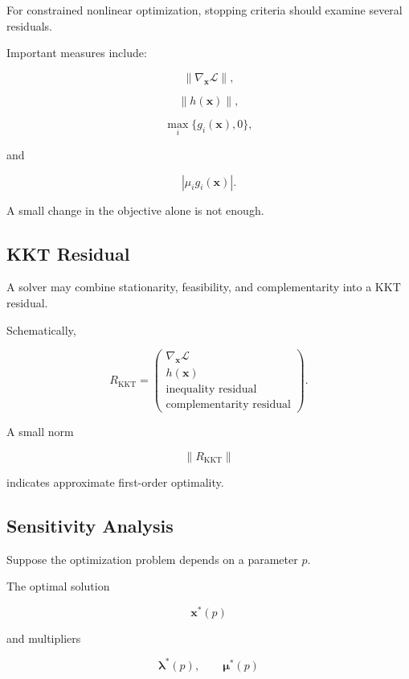 For constrained nonlinear optimization, stopping criteria should examine
several residuals.

Important measures include:

\[
\boxed{
\|\nabla_{\mathbf{x}}\mathcal{L}\|,
}
\]

\[
\boxed{
\|h(\mathbf{x})\|,
}
\]

\[
\boxed{
\max_i
\{
g_i(\mathbf{x}),0
\},
}
\]

and

\[
\boxed{
|\mu_i g_i(\mathbf{x})|.
}
\]

A small change in the objective alone is not enough.

\subsection{KKT Residual}
\label{subsec:nlp-kkt-residual}

A solver may combine stationarity, feasibility, and complementarity into a
KKT residual.

Schematically,

\[
\boxed{
R_{\mathrm{KKT}}
=
\begin{pmatrix}
\nabla_{\mathbf{x}}\mathcal{L}
\\
h(\mathbf{x})
\\
\text{inequality residual}
\\
\text{complementarity residual}
\end{pmatrix}.
}
\]

A small norm

\[
\boxed{
\|R_{\mathrm{KKT}}\|
}
\]

indicates approximate first-order optimality.

\subsection{Sensitivity Analysis}
\label{subsec:nlp-sensitivity-analysis}

Suppose the optimization problem depends on a parameter \(p\).

The optimal solution

\[
\mathbf{x}^*(p)
\]

and multipliers

\[
\boldsymbol{\lambda}^*(p),
\qquad
\boldsymbol{\mu}^*(p)
\]

